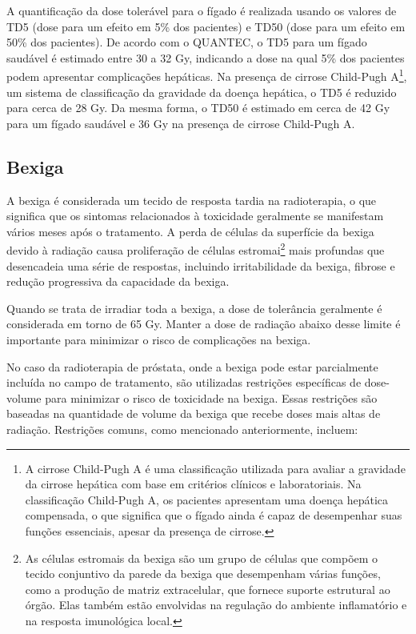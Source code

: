 \documentclass[11pt,a4paper]{article}
\begin{document}
	A quantificação da dose tolerável para o fígado é realizada usando os valores de TD5 (dose para um efeito em 5\% dos pacientes) e TD50 (dose para um efeito em 50\% dos pacientes). De acordo com o QUANTEC, o TD5 para um fígado saudável é estimado entre 30 a 32 Gy, indicando a dose na qual 5\% dos pacientes podem apresentar complicações hepáticas. Na presença de cirrose Child-Pugh A\footnote{A cirrose Child-Pugh A é uma classificação utilizada para avaliar a gravidade da cirrose hepática com base em critérios clínicos e laboratoriais. Na classificação Child-Pugh A, os pacientes apresentam uma doença hepática compensada, o que significa que o fígado ainda é capaz de desempenhar suas funções essenciais, apesar da presença de cirrose.}, um sistema de classificação da gravidade da doença hepática, o TD5 é reduzido para cerca de 28 Gy. Da mesma forma, o TD50 é estimado em cerca de 42 Gy para um fígado saudável e 36 Gy na presença de cirrose Child-Pugh A.

\subsection*{Bexiga}

	A bexiga é considerada um tecido de resposta tardia na radioterapia, o que significa que os sintomas relacionados à toxicidade geralmente se manifestam vários meses após o tratamento. A perda de células da superfície da bexiga devido à radiação causa proliferação de células estromai\footnote{As células estromais da bexiga são um grupo de células que compõem o tecido conjuntivo da parede da bexiga que  desempenham várias funções, como a produção de matriz extracelular, que fornece suporte estrutural ao órgão. Elas também estão envolvidas na regulação do ambiente inflamatório e na resposta imunológica local.} mais profundas que desencadeia uma série de respostas, incluindo irritabilidade da bexiga, fibrose e redução progressiva da capacidade da bexiga.

	Quando se trata de irradiar toda a bexiga, a dose de tolerância geralmente é considerada em torno de 65 Gy. Manter a dose de radiação abaixo desse limite é importante para minimizar o risco de complicações na bexiga.

	No caso da radioterapia de próstata, onde a bexiga pode estar parcialmente incluída no campo de tratamento, são utilizadas restrições específicas de dose-volume para minimizar o risco de toxicidade na bexiga. Essas restrições são baseadas na quantidade de volume da bexiga que recebe doses mais altas de radiação. Restrições comuns, como mencionado anteriormente, incluem:
\end{document}
